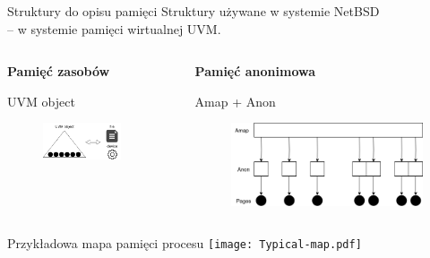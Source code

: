 \documentclass[notes]{beamer}
\begin{document}
\begin{frame}{Struktury do opisu pamięci}
  Struktury używane w systemie NetBSD\\
  -- w systemie pamięci wirtualnej UVM.
  \vfill
  \begin{columns}[t]
    \begin{column}{5cm}
      {\bf Pamięć zasobów}

      {UVM object}

      \vfill
      \begin{figure}
        \includegraphics[width=0.8\textwidth]{UVM-object.png}
      \end{figure}
    \end{column}
    \begin{column}{5cm}
      {\bf Pamięć anonimowa}

      {Amap + Anon}

      \vfill
      \begin{figure}
        \includegraphics[width=\textwidth]{Amap.png}
      \end{figure}
    \end{column}
  \end{columns}
\end{frame}

\begin{frame}{Przykładowa mapa pamięci procesu}
  \centering
  \texttt{[image: Typical-map.pdf]}
\end{frame}
\end{document}
